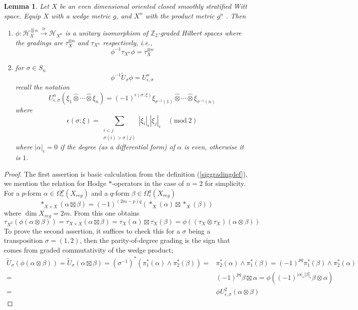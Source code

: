 \documentclass[11pt,leqno,twoside]{amsart}
\theoremstyle{plainsl}
\newtheorem{lemma}[theorem]{Lemma}
\theoremstyle{definition}
\begin{document}
\begin{lemma}
    Let $X$ be an even dimensional oriented closed smoothly stratified Witt space. Equip $X$ with a wedge metric $g$, and $X^n$ with the product metric $g^n$ . Then
    \begin{enumerate}
        \item $\phi:\mathcal{H}_X^{\widehat{\otimes}n}\xrightarrow{\cong}\mathcal{H}_{X^n} $ is a unitary isomorphism of \(\mathbb Z_2\)-graded Hilbert spaces where the gradings are $\tau^{\otimes n}_X$ and $\tau_{X^n}$ respectively, i.e., 
        \[\phi^{-1} \tau_{X^n}\phi=\tau^{\otimes n}_X\]
        \item  for $\sigma\in S_n$ \[\phi^{-1} \widetilde{U}_\sigma \phi=U^n_{\epsilon,\sigma}\]
         recall the notation \begin{equation}\label{geosign}
          U^n_{\epsilon,\sigma}(\xi_1\widehat{\otimes}\cdots
    \widehat{\otimes}\xi_n)
    =
    (-1)^{\epsilon(\sigma;\xi)}
    \xi_{\sigma^{-1}(1)}\widehat{\otimes}
    \cdots\widehat{\otimes}
    \xi_{\sigma^{-1}(n)}
    \end{equation}
    where
    \[
    \epsilon(\sigma;\xi)
    =
    \sum_{\substack{i<j\\
    \sigma(i)>\sigma(j)}}
    |\xi_i|_{\epsilon}|\xi_j|_{\epsilon}
    \quad(\mathrm{mod}\ 2)\]
   where $|\alpha|_{\epsilon}=0$ if the degree (as a differential form) of $\alpha$ is even, otherwise it is $1$.
    \end{enumerate}
\end{lemma}
\begin{proof}
The first assertion is basic calculation from the definition (\ref{siggradingdef}), we mention the relation for  Hodge $\ast$-operators in the case of $n=2$ for simplicity. For a $p$-form $\alpha \in \Omega^{p}_{c}(X_{reg})$ and  a $q$-form $\beta \in \Omega^{q}_{c}(X_{reg})$ 
\[\ast_{X\times X}(\alpha \boxtimes\beta)=(-1)^{(2m-p)q}\left(\ast_X(\alpha) \boxtimes \ast_X(\beta) \right)\]
where  $\dim X_{reg}=2m$.
From this one obtains 
\[\tau_{X^2}(\phi(\alpha {\otimes} \beta))=\tau_{X\times X}(\alpha \boxtimes\beta)=\tau_X(\alpha) \boxtimes \tau_X(\beta)=\phi((\tau_X\otimes\tau_X )(\alpha {\otimes} \beta))\]
To prove the second assertion, it suffices to check this for a $\sigma$ being a transposition $\sigma=(1,2)$, then the parity-of-degree grading is the sign that comes from graded commutativity of the wedge product;
\begin{align*}
    \widetilde{U}_\sigma (\phi(\alpha {\otimes} \beta))=\widetilde{U}_\sigma(\alpha \boxtimes\beta)=(\sigma^{-1})^*(\pi^*_1(\alpha)\wedge \pi^*_2(\beta))=&\pi^{*}_2(\alpha)\wedge \pi_1^*(\beta)=(-1)^{pq}\pi^{*}_1(\beta)\wedge \pi_2^*(\alpha)\\=&
    (-1)^{pq}\beta \boxtimes \alpha=\phi((-1)^{|\alpha|_\epsilon|\beta|_\epsilon} \beta\otimes \alpha)\\=&\phi U^2_{\epsilon,\sigma}(\alpha {\otimes}\beta)
\end{align*}
\end{proof}
\end{document}

